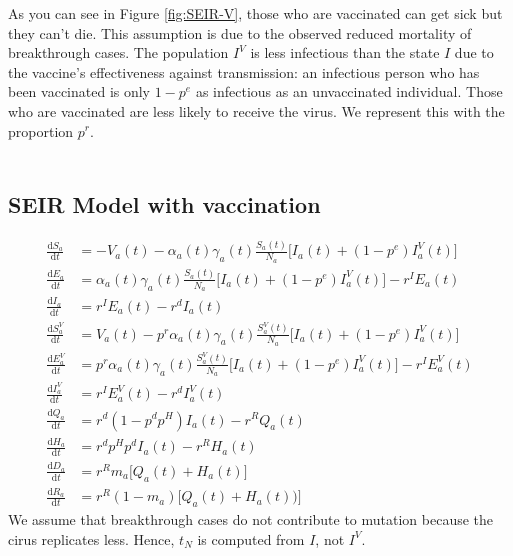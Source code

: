 \documentclass{article}
\begin{document}
As you can see in Figure \ref{fig:SEIR-V}, those who are vaccinated can get sick but they can't die. This assumption is due to the observed reduced mortality of breakthrough cases. The population $I^V$ is less infectious than the state $I$ due to the vaccine's effectiveness against transmission: an infectious person who has been vaccinated is only $1-p^e$ as infectious as an unvaccinated individual. Those who are vaccinated are less likely to receive the virus. We represent this with the proportion $p^r$.\\
\\
\subsection{SEIR Model with vaccination}
\begin{align}
    \frac{\text{d}S_a}{\text{d}t}&=  -V_a(t) - \alpha_a(t) \gamma_a(t)\frac{S_a(t)}{N_a}\big[I_a(t)+(1-p^e)I^V_a(t)\big] \label{eq:start-SEIRV}\\
     \frac{\text{d}E_a}{\text{d}t} &= \alpha_a(t) \gamma_a(t)\frac{S_a(t)}{N_a}\big[I_a(t)+(1-p^e)I^V_a(t)\big] -r^IE_a(t) \\
     \frac{\text{d}I_a}{\text{d}t}&= r^IE_a(t) - r^dI_a(t)\\
    \frac{\text{d}S^V_a}{\text{d}t}&=  V_a(t) - p^r\alpha_a(t) \gamma_a(t)\frac{S^V_a(t)}{N_a}\big[I_a(t)+(1-p^e)I^V_a(t)\big]\\
     \frac{\text{d}E^V_a}{\text{d}t} &= p^r \alpha_a(t) \gamma_a(t)\frac{S^V_a(t)}{N_a}\big[I_a(t)+(1-p^e)I^V_a(t)\big] -r^IE^V_a(t) \\
     \frac{\text{d}I^V_a}{\text{d}t}&= r^IE^V_a(t) - r^dI^V_a(t)\\   
    \frac{\text{d}Q_a}{\text{d}t} &= r^d(1-p^dp^H)I_a(t) - r^RQ_a(t) \\
    \frac{\text{d}H_a}{\text{d}t} &= r^dp^Hp^dI_a(t) - r^RH_a(t)\\
    \frac{\text{d}D_a}{\text{d}t} &= r^Rm_a\Big[Q_a(t)+H_a(t)\Big]\\
    \frac{\text{d}R_a}{\text{d}t} &= r^R(1-m_a)\Big[Q_a(t)+H_a(t))\Big] \label{eq:end-SEIRV}
\end{align}
We assume that breakthrough cases do not contribute to mutation because the cirus replicates less. Hence, $t_N$ is computed from $I$, not $I^V$.
\end{document}
